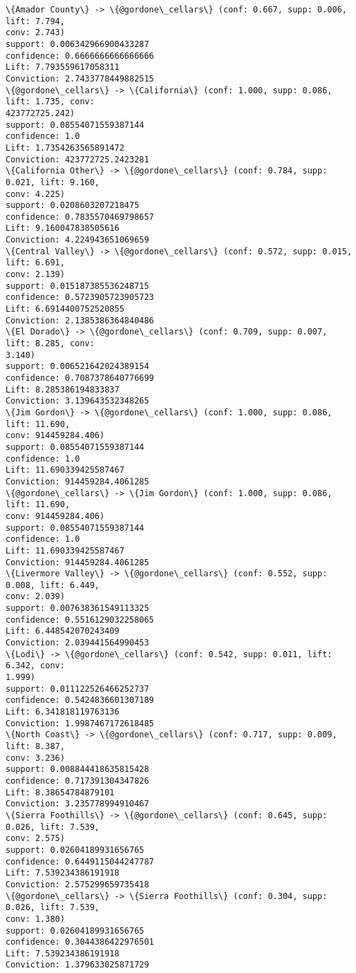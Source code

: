 \documentclass[11pt]{article}
\begin{document}
    \begin{Verbatim}[commandchars=\\\{\}]
\{Amador County\} -> \{@gordone\_cellars\} (conf: 0.667, supp: 0.006, lift: 7.794,
conv: 2.743)
support: 0.006342966900433287
confidence: 0.6666666666666666
Lift: 7.793559617058311
Conviction: 2.7433778449882515
\{@gordone\_cellars\} -> \{California\} (conf: 1.000, supp: 0.086, lift: 1.735, conv:
423772725.242)
support: 0.08554071559387144
confidence: 1.0
Lift: 1.7354263565891472
Conviction: 423772725.2423281
\{California Other\} -> \{@gordone\_cellars\} (conf: 0.784, supp: 0.021, lift: 9.160,
conv: 4.225)
support: 0.0208603207218475
confidence: 0.7835570469798657
Lift: 9.160047838505616
Conviction: 4.224943651069659
\{Central Valley\} -> \{@gordone\_cellars\} (conf: 0.572, supp: 0.015, lift: 6.691,
conv: 2.139)
support: 0.015187385536248715
confidence: 0.5723905723905723
Lift: 6.6914400752520855
Conviction: 2.1385386364840486
\{El Dorado\} -> \{@gordone\_cellars\} (conf: 0.709, supp: 0.007, lift: 8.285, conv:
3.140)
support: 0.006521642024389154
confidence: 0.7087378640776699
Lift: 8.285386194833837
Conviction: 3.139643532348265
\{Jim Gordon\} -> \{@gordone\_cellars\} (conf: 1.000, supp: 0.086, lift: 11.690,
conv: 914459284.406)
support: 0.08554071559387144
confidence: 1.0
Lift: 11.690339425587467
Conviction: 914459284.4061285
\{@gordone\_cellars\} -> \{Jim Gordon\} (conf: 1.000, supp: 0.086, lift: 11.690,
conv: 914459284.406)
support: 0.08554071559387144
confidence: 1.0
Lift: 11.690339425587467
Conviction: 914459284.4061285
\{Livermore Valley\} -> \{@gordone\_cellars\} (conf: 0.552, supp: 0.008, lift: 6.449,
conv: 2.039)
support: 0.007638361549113325
confidence: 0.5516129032258065
Lift: 6.448542070243409
Conviction: 2.039441564990453
\{Lodi\} -> \{@gordone\_cellars\} (conf: 0.542, supp: 0.011, lift: 6.342, conv:
1.999)
support: 0.011122526466252737
confidence: 0.5424836601307189
Lift: 6.341818119763136
Conviction: 1.9987467172618485
\{North Coast\} -> \{@gordone\_cellars\} (conf: 0.717, supp: 0.009, lift: 8.387,
conv: 3.236)
support: 0.008844418635815428
confidence: 0.717391304347826
Lift: 8.38654784879101
Conviction: 3.235778994910467
\{Sierra Foothills\} -> \{@gordone\_cellars\} (conf: 0.645, supp: 0.026, lift: 7.539,
conv: 2.575)
support: 0.02604189931656765
confidence: 0.6449115044247787
Lift: 7.539234386191918
Conviction: 2.575299659735418
\{@gordone\_cellars\} -> \{Sierra Foothills\} (conf: 0.304, supp: 0.026, lift: 7.539,
conv: 1.380)
support: 0.02604189931656765
confidence: 0.3044386422976501
Lift: 7.539234386191918
Conviction: 1.379633025871729

\end{Verbatim}
\end{document}
